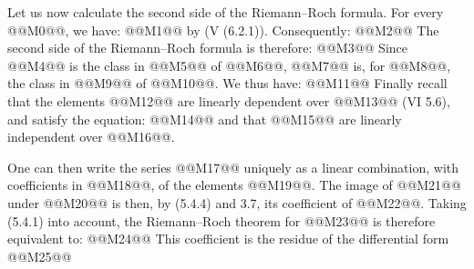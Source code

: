 Let us now calculate the second side of the Riemann--Roch formula. For every @@M0@@, we have:
@@M1@@
by (V (6.2.1)). Consequently:
@@M2@@
The second side of the Riemann--Roch formula is therefore:
@@M3@@
Since @@M4@@ is the class in @@M5@@ of @@M6@@, @@M7@@ is, for @@M8@@, the class in
@@M9@@ of @@M10@@. We thus have:
@@M11@@
Finally recall that the elements @@M12@@ are linearly dependent over @@M13@@ (VI 5.6), and satisfy the equation:
@@M14@@
and that @@M15@@ are linearly independent over @@M16@@.

One can then write the series @@M17@@ uniquely as a linear combination, with coefficients in
@@M18@@, of the elements @@M19@@. The image of @@M21@@ under @@M20@@ is then, by (5.4.4) and 3.7, its coefficient of @@M22@@. Taking (5.4.1) into account, the Riemann--Roch theorem for @@M23@@ is therefore equivalent to:
@@M24@@
This coefficient is the residue of the differential form
@@M25@@

